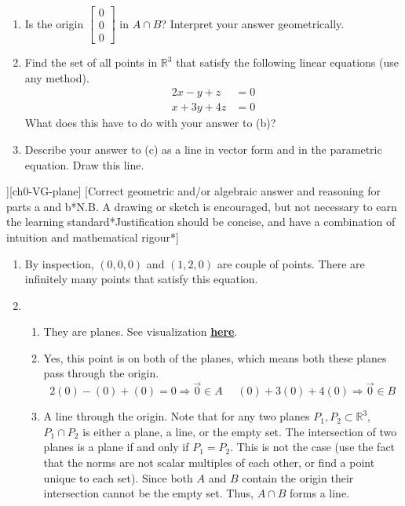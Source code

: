 \begin{SaveQuestion}
{\begin{enumerate}
\begin{enumerate}
            \item Is the origin $\begin{bmatrix} 0\\0\\0 \end{bmatrix}$ in $A \cap B$?  Interpret your answer geometrically.
            \item Find the set of all points in $\mathbb{R}^3$ that satisfy the following linear equations (use any method).
            \begin{align*} 2x - y + z &= 0 \\ x + 3y + 4 z &= 0 \end{align*} 
            What does this have to do with your answer to (b)?
            \item Describe your answer to (c) as a line in vector form and in the parametric equation. Draw this line.
            \end{enumerate}
        \end{enumerate}}
 ][ch0-VG-plane]
    [Correct geometric and/or algebraic answer and reasoning for parts a and b*N.B. A drawing or sketch is encouraged, but not necessary to earn the learning standard*Justification should be concise, and have a combination of intuition and mathematical rigour*]
    \begin{enumerate}
        \item By inspection, $(0, 0, 0)$ and $(1,2,0)$ are couple of points. There are infinitely many points that satisfy this equation.
        \item \begin{enumerate}
	\item  They are planes\PullLS*[2]. See visualization \href{https://www.geogebra.org/3d/wvme9jbr}{\textbf{here}}. 
	\item Yes, this point is on both of the planes, which means both these planes pass through the origin\PullLS*[2]. 
        $$2(0) - (0) + (0) = 0 \Longrightarrow \vec 0 \in A \ \ \ \ \ \ (0) + 3(0) + 4(0) \Longrightarrow \vec 0 \in B$$
        \item A line through the origin. Note that for any two planes $P_1, P_2 \subset \mathbb{R}^3$, $P_1 \cap P_2$ is either a plane, a line, or the empty set. The intersection of two planes is a plane if and only if $P_1 = P_2$. This is not the case (use the fact that the norms are not scalar multiples of each other, or find a point unique to each set). Since both $A$ and $B$ contain the origin their intersection cannot be the empty set. Thus, $A \cap B$ forms a line\PullLS*[1]. 

\end{enumerate}
\end{enumerate}
\end{SaveQuestion}
